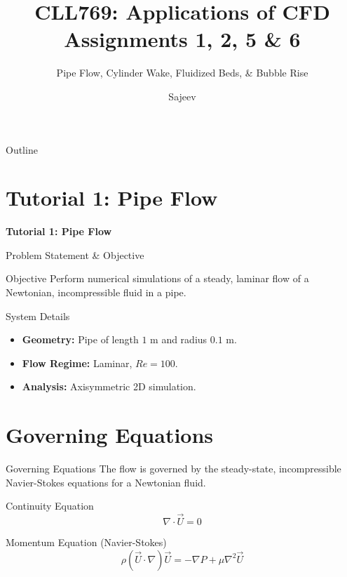 \documentclass[aspectratio=169]{beamer}
\title[CFD Assignments]{CLL769: Applications of CFD \\ Assignments 1, 2, 5 \& 6}
\subtitle{Pipe Flow, Cylinder Wake, Fluidized Beds, \& Bubble Rise}
\author[Sajeev]{Sajeev}
\institute[]{Department of Chemical Engineering, IIT Delhi}
\date{}
\newcommand{\bi}{\begin{itemize}}
\newcommand{\ei}{\end{itemize}}
\newcommand{\im}{\item}
\begin{document}
\begin{frame}
    \maketitle
\end{frame}

\begin{frame}{Outline}
    \tableofcontents
\end{frame}

\section{Tutorial 1: Pipe Flow}
\begin{frame}
    \centering \Huge \textbf{Tutorial 1: Pipe Flow}
\end{frame}

\begin{frame}{Problem Statement \& Objective}
    \begin{block}{Objective}
    Perform numerical simulations of a steady, laminar flow of a Newtonian, incompressible fluid in a pipe.
    \end{block}
    \vspace{0.3cm}
    \begin{block}{System Details}
    \bi
        \im \textbf{Geometry:} Pipe of length $1$ m and radius $0.1$ m.
        \im \textbf{Flow Regime:} Laminar, $Re = 100$.
        \im \textbf{Analysis:} Axisymmetric 2D simulation.
    \ei
    \end{block}
\end{frame}

\section{Governing Equations}
\begin{frame}{Governing Equations}
    The flow is governed by the steady-state, incompressible Navier-Stokes equations for a Newtonian fluid.

    \begin{block}{Continuity Equation}
    \[
    \nabla \cdot \vec{U} = 0
    \]
    \end{block}
    
    \begin{block}{Momentum Equation (Navier-Stokes)}
    \[
    \rho (\vec{U} \cdot \nabla) \vec{U} = -\nabla P + \mu \nabla^2 \vec{U}
    \]
    \end{block}
\end{frame}
\end{document}
